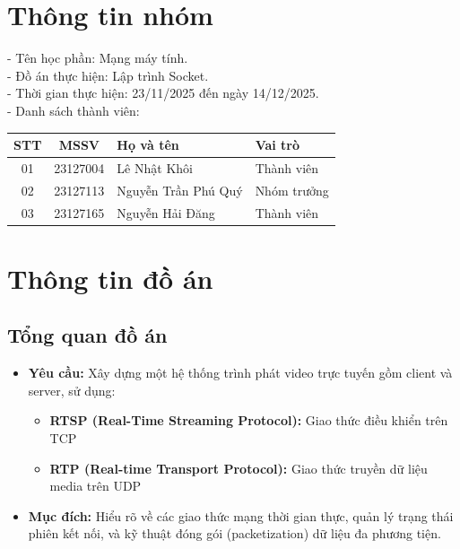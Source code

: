 \documentclass[a4paper,12pt]{article}
\begin{document}
\section{Thông tin nhóm}
-   Tên học phần: Mạng máy tính. \\
-   Đồ án thực hiện: Lập trình Socket. \\
-   Thời gian thực hiện: 23/11/2025 đến ngày 14/12/2025. \\
-   Danh sách thành viên: \\
\begin{table}[h!]
\centering
\begin{tabular}{|c|c|l|l|}
\hline
\textbf{STT} & \textbf{MSSV} & \textbf{Họ và tên} & \textbf{Vai trò} \\ \hline
01           & 23127004      & Lê Nhật Khôi       & Thành viên      \\ \hline
02           & 23127113      & Nguyễn Trần Phú Quý & Nhóm trưởng    \\ \hline
03           & 23127165      & Nguyễn Hải Đăng     & Thành viên      \\ \hline
\end{tabular}
\end{table}

\section{Thông tin đồ án}

\subsection{Tổng quan đồ án}
\begin{itemize}
    \item \textbf{Yêu cầu:} Xây dựng một hệ thống trình phát video trực tuyến gồm client và server, sử dụng:
    \begin{itemize}
        \item \textbf{RTSP (Real-Time Streaming Protocol):} Giao thức điều khiển trên TCP
        \item \textbf{RTP (Real-time Transport Protocol):} Giao thức truyền dữ liệu media trên UDP
    \end{itemize}
    \item \textbf{Mục đích:} Hiểu rõ về các giao thức mạng thời gian thực, quản lý trạng thái phiên kết nối, và kỹ thuật đóng gói (packetization) dữ liệu đa phương tiện.
\end{itemize}
\end{document}
